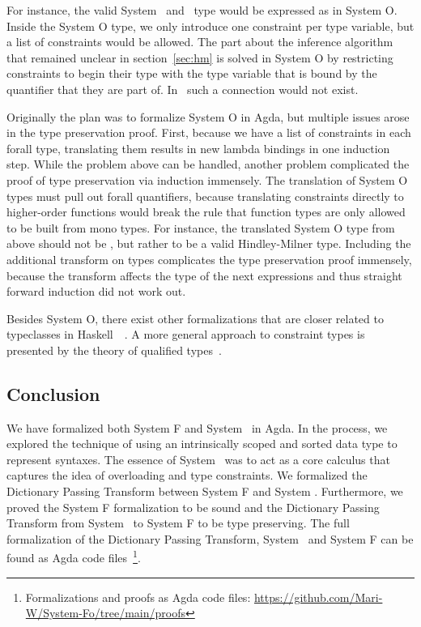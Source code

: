 \noindent For instance, the valid System \Fo\ and \HMo\ type  would be expressed as  in System O. 
Inside the System O type, we only introduce one constraint per type variable, but a list of constraints would be allowed. 
The part about the inference algorithm that remained unclear in section~\ref{sec:hm} is solved in System O by restricting constraints to begin their type with the type variable that is bound by the quantifier that they are part of. 
In \HMo\ such a connection would not exist.

\noindent Originally the plan was to formalize System O in Agda, but multiple issues arose in the type preservation proof. 
First, because we have a list of  constraints in each forall type, translating them results in  new lambda bindings in one induction step. 
While the problem above can be handled, another problem complicated the proof of type preservation via induction immensely. The translation of System O types must pull out forall quantifiers, because translating constraints directly to higher-order functions would break the rule that function types are only allowed to be built from mono types. 
For instance, the translated System O type from above should not be , but rather  to be a valid Hindley-Milner type. 
Including the additional transform on types complicates the type preservation proof immensely, because the transform affects the type of the next  expressions and thus straight forward induction did not work out.

\noindent Besides System O, there exist other formalizations that are closer related to typeclasses in Haskell~\cite{ahp}~\cite{tc}. A more general approach to constraint types is presented by the theory of qualified types~\cite{qt}.

\subsection{Conclusion}
We have formalized both System F and System \Fo\ in Agda.
In the process, we explored the technique of using an intrinsically scoped and sorted data type to represent syntaxes.
The essence of System \Fo\ was to act as a core calculus that captures the idea of overloading and type constraints.
We formalized the Dictionary Passing Transform between System F and System \Fo. 
Furthermore, we proved the System F formalization to be sound and the Dictionary Passing Transform from System \Fo\ to System F to be type preserving. 
The full formalization of the Dictionary Passing Transform, System \Fo\ and  System F can be found as Agda code files~\footnote{Formalizations and proofs as Agda code files: \url{https://github.com/Mari-W/System-Fo/tree/main/proofs}}. 

